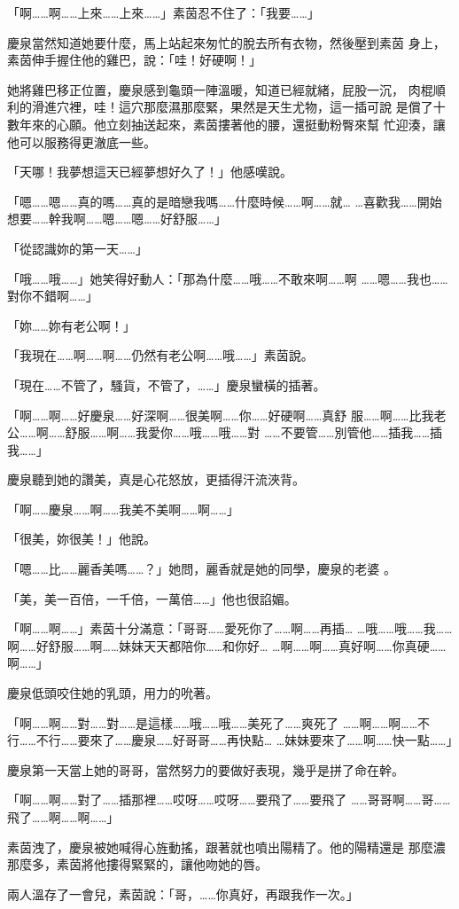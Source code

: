 「啊……啊……上來……上來……」素茵忍不住了：「我要……」

慶泉當然知道她要什麼，馬上站起來匆忙的脫去所有衣物，然後壓到素茵
身上，素茵伸手握住他的雞巴，說：「哇！好硬啊！」

她將雞巴移正位置，慶泉感到龜頭一陣溫暖，知道已經就緒，屁股一沉，
肉棍順利的滑進穴裡，哇！這穴那麼濕那麼緊，果然是天生尤物，這一插可說
是償了十數年來的心願。他立刻抽送起來，素茵摟著他的腰，還挺動粉臀來幫
忙迎湊，讓他可以服務得更澈底一些。

「天哪！我夢想這天已經夢想好久了！」他感嘆說。

「嗯……嗯……真的嗎……真的是暗戀我嗎……什麼時候……啊……就…
…喜歡我……開始想要……幹我啊……嗯……嗯……好舒服……」

「從認識妳的第一天……」

「哦……哦……」她笑得好動人：「那為什麼……哦……不敢來啊……啊
……嗯……我也……對你不錯啊……」

「妳……妳有老公啊！」

「我現在……啊……啊……仍然有老公啊……哦……」素茵說。

「現在……不管了，騷貨，不管了，……」慶泉蠻橫的插著。

「啊……啊……好慶泉……好深啊……很美啊……你……好硬啊……真舒
服……啊……比我老公……啊……舒服……啊……我愛你……哦……哦……對
……不要管……別管他……插我……插我……」

慶泉聽到她的讚美，真是心花怒放，更插得汗流浹背。

「啊……慶泉……啊……我美不美啊……啊……」

「很美，妳很美！」他說。

「嗯……比……麗香美嗎……？」她問，麗香就是她的同學，慶泉的老婆
。

「美，美一百倍，一千倍，一萬倍……」他也很諂媚。

「啊……啊……」素茵十分滿意：「哥哥……愛死你了……啊……再插…
…哦……哦……我……啊……好舒服……啊……妹妹天天都陪你……和你好…
…啊……啊……真好啊……你真硬……啊……」

慶泉低頭咬住她的乳頭，用力的吮著。

「啊……啊……對……對……是這樣……哦……哦……美死了……爽死了
……啊……啊……不行……不行……要來了……慶泉……好哥哥……再快點…
…妹妹要來了……啊……快一點……」

慶泉第一天當上她的哥哥，當然努力的要做好表現，幾乎是拼了命在幹。

「啊……啊……對了……插那裡……哎呀……哎呀……要飛了……要飛了
……哥哥啊……哥……飛了……啊……啊……」

素茵洩了，慶泉被她喊得心旌動搖，跟著就也噴出陽精了。他的陽精還是
那麼濃那麼多，素茵將他摟得緊緊的，讓他吻她的唇。

兩人溫存了一會兒，素茵說：「哥，……你真好，再跟我作一次。」

